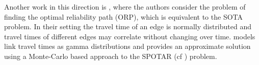 Another work in this direction is \cite{Seshadri10}, where the authors consider the problem of finding the optimal reliability path (ORP), which is equivalent to the SOTA problem. In their setting the travel time of an edge is normally distributed and travel times of different edges may correlate without changing over time. \cite{Zockaei13} models link travel times as gamma distributions and provides an approximate solution using a Monte-Carlo based approach to the SPOTAR (cf \cite{Nie09b}) problem. 




